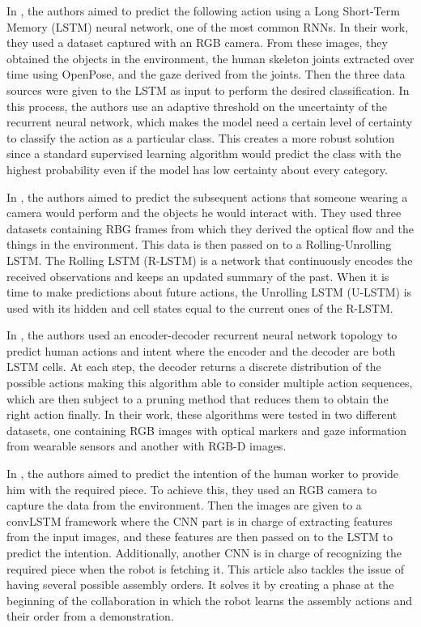 In \cite{Canuto2021}, the authors aimed to predict the following action using a Long Short-Term Memory (LSTM) neural network, one of the most common RNNs. In their work, they used a dataset captured with an RGB camera. From these images, they obtained the objects in the environment, the human skeleton joints extracted over time using OpenPose, and the gaze derived from the joints. Then the three data sources were given to the LSTM as input to perform the desired classification. In this process, the authors use an adaptive threshold on the uncertainty of the recurrent neural network, which makes the model need a certain level of certainty to classify the action as a particular class. This creates a more robust solution since a standard supervised learning algorithm would predict the class with the highest probability even if the model has low certainty about every category.

In \cite{Furnari2021}, the authors aimed to predict the subsequent actions that someone wearing a camera would perform and the objects he would interact with. They used three datasets containing RBG frames from which they derived the optical flow and the things in the environment. This data is then passed on to a Rolling-Unrolling LSTM. The Rolling LSTM (R-LSTM) is a network that continuously encodes the received observations and keeps an updated summary of the past. When it is time to make predictions about future actions, the Unrolling LSTM (U-LSTM) is used with its hidden and cell states equal to the current ones of the R-LSTM.

In \cite{Schydlo2018}, the authors used an encoder-decoder recurrent neural network topology to predict human actions and intent where the encoder and the decoder are both LSTM cells. At each step, the decoder returns a discrete distribution of the possible actions making this algorithm able to consider multiple action sequences, which are then subject to a pruning method that reduces them to obtain the right action finally. In their work, these algorithms were tested in two different datasets, one containing RGB images with optical markers and gaze information from wearable sensors and another with RGB-D images.

In \cite{Zhang2022}, the authors aimed to predict the intention of the human worker to provide him with the required piece. To achieve this, they used an RGB camera to capture the data from the environment. Then the images are given to a convLSTM framework where the CNN part is in charge of extracting features from the input images, and these features are then passed on to the LSTM to predict the intention. Additionally, another CNN is in charge of recognizing the required piece when the robot is fetching it. This article also tackles the issue of having several possible assembly orders. It solves it by creating a phase at the beginning of the collaboration in which the robot learns the assembly actions and their order from a demonstration.

